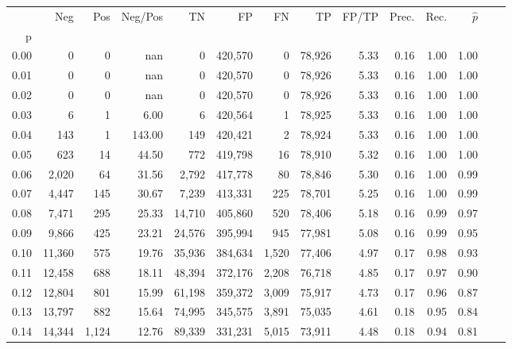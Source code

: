 \begin{tabular}{rrrrrrrrrrrrrr}
\toprule
{} &     Neg &    Pos & Neg/Pos &       TN &       FP &      FN &      TP & FP/TP & Prec. &  Rec. & $\hat{p}$ \\
p    &         &        &         &          &          &         &         &       &       &       &           \\
\midrule
0.00 &       0 &      0 &     nan &        0 &  420,570 &       0 &  78,926 &  5.33 &  0.16 &  1.00 &      1.00 \\
0.01 &       0 &      0 &     nan &        0 &  420,570 &       0 &  78,926 &  5.33 &  0.16 &  1.00 &      1.00 \\
0.02 &       0 &      0 &     nan &        0 &  420,570 &       0 &  78,926 &  5.33 &  0.16 &  1.00 &      1.00 \\
0.03 &       6 &      1 &    6.00 &        6 &  420,564 &       1 &  78,925 &  5.33 &  0.16 &  1.00 &      1.00 \\
0.04 &     143 &      1 &  143.00 &      149 &  420,421 &       2 &  78,924 &  5.33 &  0.16 &  1.00 &      1.00 \\
0.05 &     623 &     14 &   44.50 &      772 &  419,798 &      16 &  78,910 &  5.32 &  0.16 &  1.00 &      1.00 \\
0.06 &   2,020 &     64 &   31.56 &    2,792 &  417,778 &      80 &  78,846 &  5.30 &  0.16 &  1.00 &      0.99 \\
0.07 &   4,447 &    145 &   30.67 &    7,239 &  413,331 &     225 &  78,701 &  5.25 &  0.16 &  1.00 &      0.99 \\
0.08 &   7,471 &    295 &   25.33 &   14,710 &  405,860 &     520 &  78,406 &  5.18 &  0.16 &  0.99 &      0.97 \\
0.09 &   9,866 &    425 &   23.21 &   24,576 &  395,994 &     945 &  77,981 &  5.08 &  0.16 &  0.99 &      0.95 \\
0.10 &  11,360 &    575 &   19.76 &   35,936 &  384,634 &   1,520 &  77,406 &  4.97 &  0.17 &  0.98 &      0.93 \\
0.11 &  12,458 &    688 &   18.11 &   48,394 &  372,176 &   2,208 &  76,718 &  4.85 &  0.17 &  0.97 &      0.90 \\
0.12 &  12,804 &    801 &   15.99 &   61,198 &  359,372 &   3,009 &  75,917 &  4.73 &  0.17 &  0.96 &      0.87 \\
0.13 &  13,797 &    882 &   15.64 &   74,995 &  345,575 &   3,891 &  75,035 &  4.61 &  0.18 &  0.95 &      0.84 \\
0.14 &  14,344 &  1,124 &   12.76 &   89,339 &  331,231 &   5,015 &  73,911 &  4.48 &  0.18 &  0.94 &      0.81 \\

\end{tabular}
